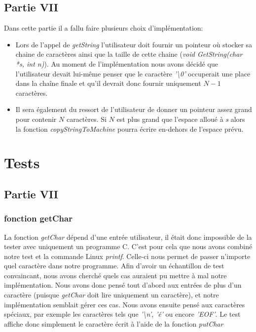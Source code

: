 \documentclass{article}
\begin{document}
\subsection{Partie VII}
Dans cette partie il a fallu faire plusieurs choix d'implémentation:
\begin{itemize}
    \item Lors de l'appel de \textit{getString} l'utilisateur doit fournir un pointeur où stocker sa chaine de caractères ainsi que la taille de cette chaine \linebreak (\textit{void GetString(char
    *s, int n)}).
    Au moment de l'implémentation nous avons décidé que l'utilisateur devait lui-même penser que le caractère \textit{'\textbackslash0'} occuperait une place dans la chaîne finale et qu'il devrait
    donc fournir uniquement $N-1$ caractères.
    \item Il sera également du ressort de l'utilisateur de donner un pointeur assez grand pour contenir $N$ caractères. Si $N$ est plus grand que l'espace alloué à \textit{s} alors la fonction
    \textit{copyStringToMachine} pourra écrire en-dehors de l'espace prévu.
\end{itemize}


\section{Tests}

\subsection{Partie VII}
    \subsubsection{fonction getChar}
    La fonction \textit{getChar} dépend d'une entrée utilisateur, il était donc impossible de la tester avec uniquement
    un programme C. C'est pour cela que nous avons combiné notre test et la commande Linux \textit{printf}. Celle-ci
    nous permet de passer n'importe quel caractère dans notre programme. Afin d'avoir un échantillon de test convaincant,
    nous avons cherché quels cas auraient pu mettre à mal notre implémentation. Nous avons donc pensé tout d'abord aux entrées
    de plus d'un caractère (puisque \textit{getChar} doit lire uniquement un caractère), et notre implémentation semblait gérer ces cas.
    Nous avons ensuite pensé aux caractères spéciaux, par exemple les caractères tels que \textit{'\textbackslash n'}, \textit{'é'} ou encore \textit{'EOF'}.
    Le test affiche donc simplement le caractère écrit à l'aide de la fonction \textit{putChar}
\end{document}
